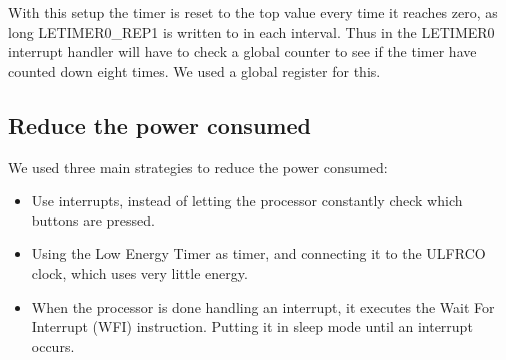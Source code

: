 With this setup the timer is reset to the top value every time it reaches zero, as long LETIMER0\_REP1 is written to in each interval. Thus in the LETIMER0 interrupt handler will have to check a global
counter to see if the timer have counted down eight times. We used a global register for this.

\subsection{Reduce the power consumed}

We used three main strategies to reduce the power consumed:

\begin{itemize}
	\item Use interrupts, instead of letting the processor constantly check which buttons are pressed.
	\item Using the Low Energy Timer as timer, and connecting it to the ULFRCO clock, which uses very little energy.
	\item When the processor is done handling an interrupt, it executes the Wait For Interrupt (WFI) instruction. Putting it in sleep mode until an interrupt occurs. 
\end{itemize}





